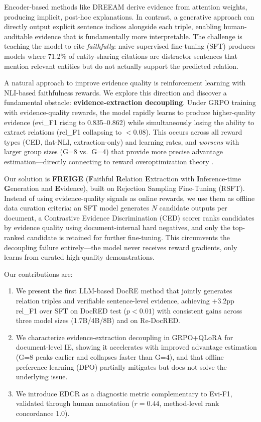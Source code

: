 \documentclass[11pt]{article}
\newcommand{\method}{FREIGE}
\newcommand{\ced}{CED}
\newcommand{\rsft}{RSFT}
\begin{document}
Encoder-based methods like DREEAM \cite{ma2023dreeam} derive evidence from attention weights, producing implicit, post-hoc explanations.
In contrast, a generative approach can directly output explicit sentence indices alongside each triple, enabling human-auditable evidence that is fundamentally more interpretable.
The challenge is teaching the model to cite \emph{faithfully}: naive supervised fine-tuning (SFT) produces models where 71.2\% of entity-sharing citations are distractor sentences that mention relevant entities but do not actually support the predicted relation.

A natural approach to improve evidence quality is reinforcement learning with NLI-based faithfulness rewards.
We explore this direction and discover a fundamental obstacle: \textbf{evidence-extraction decoupling}.
Under GRPO training with evidence-quality rewards, the model rapidly learns to produce higher-quality evidence (evi\_F1 rising to 0.835--0.862) while simultaneously losing the ability to extract relations (rel\_F1 collapsing to $<$0.08).
This occurs across all reward types (CED, flat-NLI, extraction-only) and learning rates, and \emph{worsens} with larger group sizes (G=8 vs.\ G=4) that provide more precise advantage estimation---directly connecting to reward overoptimization theory \cite{gao2023scaling}.

Our solution is \textbf{\method{}} (\textbf{F}aithful \textbf{R}elation \textbf{E}xtraction with \textbf{I}nference-time \textbf{G}eneration and \textbf{E}vidence), built on Rejection Sampling Fine-Tuning (\rsft{}).
Instead of using evidence-quality signals as online rewards, we use them as offline data curation criteria: an SFT model generates $N$ candidate outputs per document, a Contrastive Evidence Discrimination (\ced{}) scorer ranks candidates by evidence quality using document-internal hard negatives, and only the top-ranked candidate is retained for further fine-tuning.
This circumvents the decoupling failure entirely---the model never receives reward gradients, only learns from curated high-quality demonstrations.

Our contributions are:
\begin{enumerate}
\item We present the first LLM-based DocRE method that jointly generates relation triples and verifiable sentence-level evidence, achieving +3.2pp rel\_F1 over SFT on DocRED test ($p{<}0.01$) with consistent gains across three model sizes (1.7B/4B/8B) and on Re-DocRED.
\item We characterize evidence-extraction decoupling in GRPO+QLoRA for document-level IE, showing it accelerates with improved advantage estimation (G=8 peaks earlier and collapses faster than G=4), and that offline preference learning (DPO) partially mitigates but does not solve the underlying issue.
\item We introduce EDCR as a diagnostic metric complementary to Evi-F1, validated through human annotation ($r{=}0.44$, method-level rank concordance 1.0).
\end{enumerate}
\end{document}
